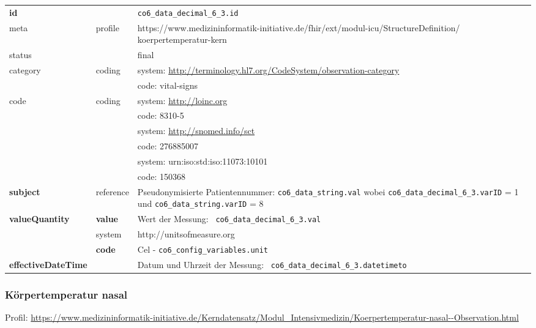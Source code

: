 \begin{longtable}{|l|l|p{7.5cm}|}
	\hline
	\rowcolor{lightgray} \multicolumn{3}{|l|}{Data Mapping (inhaltlich)} \\ \hline
	\textbf{id} &  & \texttt{co6\_data\_decimal\_6\_3.id} \\ \hline
	meta & profile & https://www.medizininformatik-initiative.de/fhir/ext/modul-icu/StructureDefinition/ koerpertemperatur-kern \\ \hline 
	status &  & final   \\ \hline 
	category & coding & system: \url{http://terminology.hl7.org/CodeSystem/observation-category} \\
	\cline{3-3}
	& & code: vital-signs \\ \hline
	code & coding & system: \url{http://loinc.org} \\ 
	\cline{3-3} 
	&  & code: 8310-5 \\ 
	\cline{3-3} 
	&  & system: \url{http://snomed.info/sct} \\ 
	\cline{3-3}
	&  & code: 276885007 \\ 
	\cline{3-3} 
	&  & system: urn:iso:std:iso:11073:10101\\ 
	\cline{3-3}
	&  & code: 150368 \\ \hline
	\textbf{subject} & reference & Pseudonymisierte Patientennummer: \texttt{co6\_data\_string.val} wobei \texttt{co6\_data\_decimal\_6\_3.varID} = 1 und \texttt{co6\_data\_string.varID} = 8 \\ \hline
	\textbf{valueQuantity}  & \textbf{value} & Wert der Messung: \texttt{
		co6\_data\_decimal\_6\_3.val} \\
	\cline{2-3}
	& system & http://unitsofmeasure.org \\
	\cline{2-3}
	& \textbf{code} & Cel - \texttt{co6\_config\_variables.unit} \\ \hline
	\textbf{effectiveDateTime}  & & Datum und Uhrzeit der Messung: \texttt{
		co6\_data\_decimal\_6\_3.datetimeto} \\ \hline
\end{longtable}

\subsubsection{Körpertemperatur nasal} 
Profil: \url{https://www.medizininformatik-initiative.de/Kerndatensatz/Modul_Intensivmedizin/Koerpertemperatur-nasal--Observation.html}


